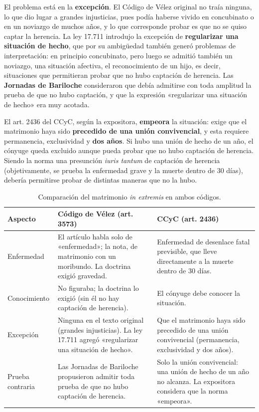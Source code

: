 \documentclass[12pt,oneside]{book}
\begin{document}
El problema está en la \textbf{excepción}. El Código de Vélez original no traía ninguna, lo que dio lugar a grandes injusticias, pues podía haberse vivido en concubinato o en un noviazgo de muchos años, y lo que corresponde probar es que no se quiso captar la herencia. La ley 17.711 introdujo la excepción de \textbf{regularizar una situación de hecho}, que por su ambigüedad también generó problemas de interpretación: en principio concubinato, pero luego se admitió también un noviazgo, una situación afectiva, el reconocimiento de un hijo, es decir, situaciones que permitieran probar que no hubo captación de herencia. Las \textbf{Jornadas de Bariloche} consideraron que debía admitirse con toda amplitud la prueba de que no hubo captación, y que la expresión «regularizar una situación de hecho» era muy acotada.

El art. 2436 del CCyC, según la expositora, \textbf{empeora} la situación: exige que el matrimonio haya sido \textbf{precedido de una unión convivencial}, y esta requiere permanencia, exclusividad y \textbf{dos años}. Si hubo una unión de hecho de un año, el cónyuge queda excluido aunque pueda probar que no hubo captación de herencia. Siendo la norma una presunción \textit{iuris tantum} de captación de herencia (objetivamente, se prueba la enfermedad grave y la muerte dentro de 30 días), debería permitirse probar de distintas maneras que no la hubo.

\begin{table}[H]
\centering
\small
\begin{tabularx}{\textwidth}{
    >{\raggedright\arraybackslash}p{2.2cm}
    >{\raggedright\arraybackslash}X
    >{\raggedright\arraybackslash}X
}
\toprule
\textbf{Aspecto} & \textbf{Código de Vélez (art. 3573)} & \textbf{CCyC (art. 2436)} \\
\midrule
Enfermedad & El artículo habla solo de «enfermedad»; la nota, de matrimonio con un moribundo. La doctrina exigió gravedad. & Enfermedad de desenlace fatal previsible, que lleve directamente a la muerte dentro de 30 días. \\
\addlinespace
Conocimiento & No figuraba; la doctrina lo exigió (sin él no hay captación de herencia). & El cónyuge debe conocer la situación. \\
\addlinespace
Excepción & Ninguna en el texto original (grandes injusticias). La ley 17.711 agregó «regularizar una situación de hecho». & Que el matrimonio haya sido precedido de una unión convivencial (permanencia, exclusividad y dos años). \\
\addlinespace
Prueba contraria & Las Jornadas de Bariloche propusieron admitir toda prueba de que no hubo captación de herencia. & Solo la unión convivencial: una unión de hecho de un año no alcanza. La expositora considera que la norma «empeora». \\
\bottomrule
\end{tabularx}
\caption*{Comparación del matrimonio \textit{in extremis} en ambos códigos.}
\end{table}
\end{document}
